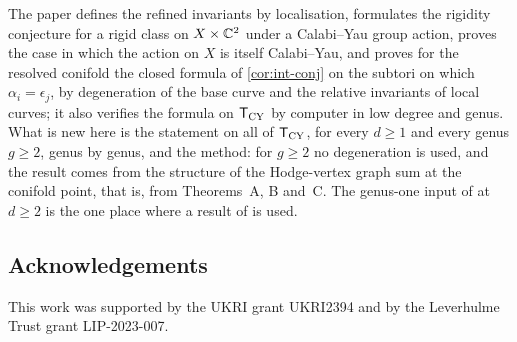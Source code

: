 The paper \cite{BS} defines the refined invariants by localisation, formulates the rigidity conjecture for a rigid class on $X\times\mathbb{C}^2$ under a Calabi--Yau group action, proves the case in which the action on $X$ is itself Calabi--Yau, and proves for the resolved conifold the closed formula of \cref{cor:int-conj} on the subtori on which $\alpha_i=\epsilon_j$, by degeneration of the base curve and the relative invariants of local curves; it also verifies the formula on $\mathsf{T}_{\mathrm{CY}}$ by computer in low degree and genus. What is new here is the statement on all of $\mathsf{T}_{\mathrm{CY}}$, for every $d\geq1$ and every genus $g\geq2$, genus by genus, and the method: for $g\geq2$ no degeneration is used, and the result comes from the structure of the Hodge-vertex graph sum at the conifold point, that is, from Theorems~A, B and~C. The genus-one input of \cite{BS} at $d\geq2$ is the one place where a result of \cite{BS} is used.

\subsection*{Acknowledgements}

This work was supported by the UKRI grant UKRI2394 and by the Leverhulme Trust grant LIP-2023-007.
